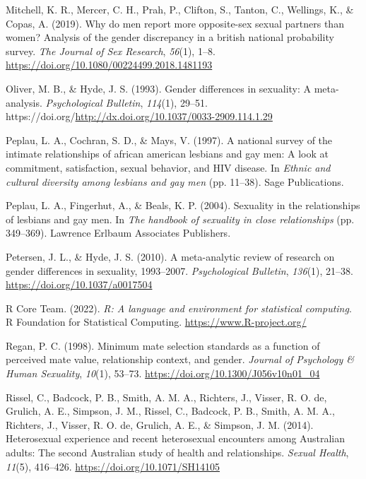 \documentclass[
  11pt,
]{article}
\newlength{\cslhangindent}
\newlength{\cslentryspacingunit} %
\newenvironment{CSLReferences}[2] %
 {%
  \setlength{\parindent}{0pt}
  \ifodd #1
  \let\oldpar\par
  \def\par{\hangindent=\cslhangindent\oldpar}
  \fi
  \setlength{\parskip}{#2\cslentryspacingunit}
 }%
 {}
\begin{document}
\begin{CSLReferences}{1}{0}
\leavevmode{}%
Mitchell, K. R., Mercer, C. H., Prah, P., Clifton, S., Tanton, C.,
Wellings, K., \& Copas, A. (2019). Why do men report more opposite-sex
sexual partners than women? Analysis of the gender discrepancy in a
british national probability survey. \emph{The Journal of Sex Research},
\emph{56}(1), 1--8. \url{https://doi.org/10.1080/00224499.2018.1481193}

\leavevmode{}%
Oliver, M. B., \& Hyde, J. S. (1993). Gender differences in sexuality: A
meta-analysis. \emph{Psychological Bulletin}, \emph{114}(1), 29--51.
https://doi.org/\url{http://dx.doi.org/10.1037/0033-2909.114.1.29}

\leavevmode{}%
Peplau, L. A., Cochran, S. D., \& Mays, V. (1997). A national survey of
the intimate relationships of african american lesbians and gay men: A
look at commitment, satisfaction, sexual behavior, and {HIV} disease. In
\emph{Ethnic and cultural diversity among lesbians and gay men} (pp.
11--38). Sage Publications.

\leavevmode{}%
Peplau, L. A., Fingerhut, A., \& Beals, K. P. (2004). Sexuality in the
relationships of lesbians and gay men. In \emph{The handbook of
sexuality in close relationships} (pp. 349--369). Lawrence Erlbaum
Associates Publishers.

\leavevmode{}%
Petersen, J. L., \& Hyde, J. S. (2010). A meta-analytic review of
research on gender differences in sexuality, 1993--2007.
\emph{Psychological Bulletin}, \emph{136}(1), 21--38.
\url{https://doi.org/10.1037/a0017504}

\leavevmode{}%
R Core Team. (2022). \emph{R: A language and environment for statistical
computing}. R Foundation for Statistical Computing.
\url{https://www.R-project.org/}

\leavevmode{}%
Regan, P. C. (1998). Minimum mate selection standards as a function of
perceived mate value, relationship context, and gender. \emph{Journal of
Psychology \& Human Sexuality}, \emph{10}(1), 53--73.
\url{https://doi.org/10.1300/J056v10n01_04}

\leavevmode{}%
Rissel, C., Badcock, P. B., Smith, A. M. A., Richters, J., Visser, R. O.
de, Grulich, A. E., Simpson, J. M., Rissel, C., Badcock, P. B., Smith,
A. M. A., Richters, J., Visser, R. O. de, Grulich, A. E., \& Simpson, J.
M. (2014). Heterosexual experience and recent heterosexual encounters
among {A}ustralian adults: The second {A}ustralian study of health and
relationships. \emph{Sexual Health}, \emph{11}(5), 416--426.
\url{https://doi.org/10.1071/SH14105}


\end{CSLReferences}
\end{document}
